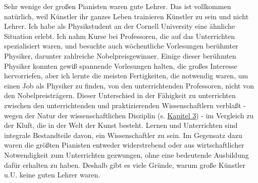Sehr wenige der großen Pianisten waren gute Lehrer.
Das ist vollkommen natürlich, weil Künstler ihr ganzes Leben trainieren Künstler zu sein und nicht Lehrer.
Ich habe als Physikstudent an der Cornell University eine ähnliche Situation erlebt. Ich nahm Kurse bei Professoren, die auf das Unterrichten spezialisiert waren, und besuchte auch wöchentliche Vorlesungen berühmter Physiker, darunter zahlreiche Nobelpreisgewinner.
Einige dieser berühmten Physiker konnten gewiß spannende Vorlesungen halten, die großes Interesse hervorriefen, aber ich lernte die meisten Fertigkeiten, die notwendig waren, um einen Job als Physiker zu finden, von den unterrichtenden Professoren, nicht von den Nobelpreisträgern.
Dieser Unterschied in der Fähigkeit zu unterrichten zwischen den unterrichtenden und praktizierenden Wissenschaftlern verblaßt - wegen der Natur der wissenschaftlichen Disziplin (s. \hyperref[c3_1]{Kapitel 3}) - im Vergleich zu der Kluft, die in der Welt der Kunst besteht.
Lernen und Unterrichten sind integrale Bestandteile davon, ein Wissenschaftler zu sein.
Im Gegensatz dazu waren die größten Pianisten entweder widerstrebend oder aus wirtschaftlicher Notwendigkeit zum Unterrichten gezwungen, ohne eine bedeutende Ausbildung dafür erhalten zu haben.
Deshalb gibt es viele Gründe, warum große Künstler u.U. keine guten Lehrer waren.

